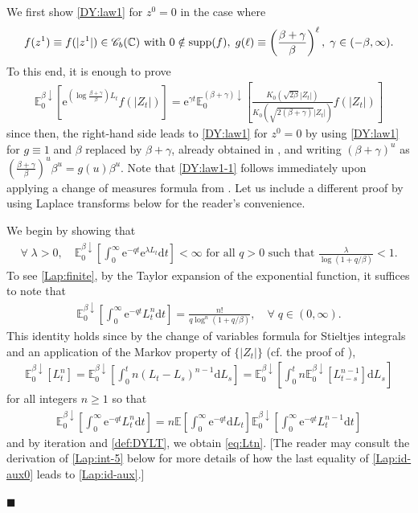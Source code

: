 \documentclass[12pt, twoside]{article}
\numberwithin{figure}{section}
\newcommand{\e}{{\mathrm e}}
\newcommand{\1}{\mathds 1}
\newcommand{\C}{{\mathscr C}}
\newcommand{\da}{{\downarrow}}
\newcommand{\supp}{{\rm supp}}
\newcommand{\E}{{\mathbb E}}
\renewcommand{\d}{{\mathrm d}}
\newcommand{\2}{{\mathbf 1}}
\renewenvironment{proof}[1][\proofname]{\noindent {\bfseries #1.}\;}{\hfill\ensuremath{\blacksquare}\\}
\begin{document}
\begin{proof}[Proof of Theorem~\ref{thm:formulas}]
 We first show \eqref{DY:law1} for $z^0=0$ in the case where
\begin{align}
f(z^1)\equiv f(|z^1|)\in \C_{b}(\Bbb C)\mbox{ with $0\notin \supp(f)$},\; g(\ell)\equiv \left(\frac{\beta+\gamma}{\beta}\right)^\ell,\;\gamma\in (-\beta,\infty).\label{DY:ass}
\end{align}
To this end, it is enough to prove 
\begin{align}\label{DY:law1-1}
\E^{\beta\da}_0[\e^{(\log \frac{\beta+\gamma}{\beta})L_t}f(|Z_t|)]=\e^{\gamma t}\E^{(\beta+\gamma)\da}_0\left[\frac{K_0(\sqrt{2\beta}|Z_t|)}{K_0(\sqrt{2(\beta+\gamma)}|Z_t|)}f(|Z_t|)\right]
\end{align}
since then, the right-hand side leads to \eqref{DY:law1} for $z^0=0$ by using \eqref{DY:law1} for $g\equiv 1$ and $\beta$ replaced by $\beta+\gamma$, already obtained in \cite[Theorem~2.10]{C:BES}, and writing $(\beta+\gamma)^u$ as $(\frac{\beta+\gamma}{\beta})^u \beta^u=g(u)\beta^u$. Note that
 \eqref{DY:law1-1} follows immediately upon applying a change of measures formula from \cite[(2.7) of Theorem~2.2 on p.884]{DY:Krein}. Let us include a different proof by using Laplace transforms below for the reader's convenience. 
 
We begin by showing that 
\begin{align}\label{Lap:finite}
\forall\;\lambda>0,\quad 
\E^{\beta\da}_0\left[\int_0^\infty \e^{-qt}\e^{\lambda L_t}\d t\right]<\infty\mbox{ for all $q>0$ such that }\frac{\lambda}{\log (1+q/\beta)}<1.
\end{align}
To see \eqref{Lap:finite}, by the Taylor expansion of the exponential function, it suffices to note that
\begin{align}\label{eq:Ltn}
\E^{\beta\da }_0\left[\int_0^\infty \e^{-q t}L_t^n\d t\right]=\frac{n!}{q\log^n(1+q/\beta)},\quad \forall\;q\in (0,\infty).
\end{align}
This identity holds since by the change of variables formula for Stieltjes integrals \cite[(4.6) Proposition on p.6]{RY} and an application of the Markov property of $\{|Z_t|\}$ (cf. the proof of \cite[Proposition~5.6]{C:BES}),
\begin{align}\label{Lap:id-aux0}
\E^{\beta\da }_0[L_t^n]=\E^{\beta\da}_0\left[\int_0^t n(L_{t}-L_s)^{n-1}\d L_s\right]=\E^{\beta\da}_0\left[\int_0^t n\E^{\beta\da}_0[L^{n-1}_{t-s}]\d L_s\right]
\end{align}
for all integers $n\geq 1$ so that 
\begin{align}\label{Lap:id-aux}
\E^{\beta\da }_0\left[\int_0^\infty \e^{-q t}L_t^n\d t\right]=n\E\left[\int_0^\infty \e^{-qt}\d L_t\right]\E^{\beta\da }_0\left[\int_0^\infty \e^{-q t}L_t^{n-1}\d t\right]
\end{align}
and by iteration and \eqref{def:DYLT}, we obtain \eqref{eq:Ltn}. [The reader may consult the derivation of \eqref{Lap:int-5} below for more details of how the last equality of \eqref{Lap:id-aux0} leads to \eqref{Lap:id-aux}.]


\end{proof}
\end{document}
